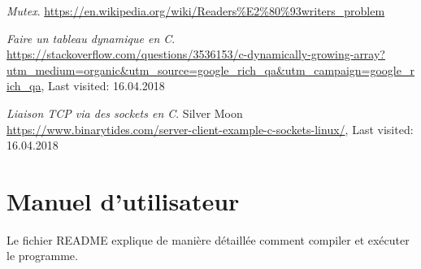 \documentclass[11pt,a4paper]{article}
\begin{document}

\begin{thebibliography}{20}

\textit{Mutex}.	%
\url{https://en.wikipedia.org/wiki/Readers\%E2\%80\%93writers_problem}

\textit{Faire un tableau dynamique en C}.					    %
\url{https://stackoverflow.com/questions/3536153/c-dynamically-growing-array?utm_medium=organic&utm_source=google_rich_qa&utm_campaign=google_rich_qa},	%
Last visited: 16.04.2018							%

\textit{Liaison TCP via des sockets en C}.					    %
Silver Moon
\url{https://www.binarytides.com/server-client-example-c-sockets-linux/},	%
Last visited: 16.04.2018							%
\end{thebibliography}




\appendix 
\renewcommand{\thesubsection}{\Alph{section}.\arabic{subsection}}

\section{Manuel d'utilisateur} \label{app:annexe}
Le fichier README explique de manière détaillée comment compiler et exécuter le programme.


\end{document}
